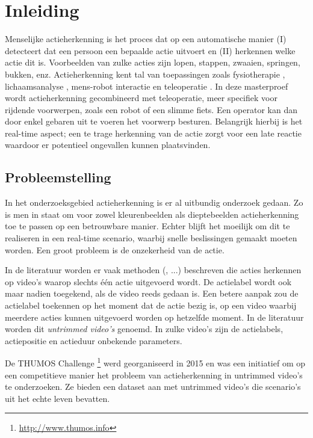 \setcounter{page}{1}
\chapter{Inleiding}
\label{ch:Inleiding}
Menselijke actieherkenning is het proces dat op een automatische manier (I) detecteert dat een persoon een bepaalde actie uitvoert en (II) herkennen welke actie dit is. Voorbeelden van zulke acties zijn lopen, stappen, zwaaien, springen, bukken, enz. Actieherkenning kent tal van toepassingen zoals fysiotherapie \cite{Deboeverie2016}, lichaamsanalyse \cite{Devi2015}, mens-robot interactie \cite{Li2018} en teleoperatie \cite{Ajili2017}. In deze masterproef wordt actieherkenning gecombineerd met teleoperatie, meer specifiek voor rijdende voorwerpen, zoals een robot of een slimme fiets. Een operator kan dan door enkel gebaren uit te voeren het voorwerp besturen. Belangrijk hierbij is het real-time aspect; een te trage herkenning van de actie zorgt voor een late reactie waardoor er potentieel ongevallen kunnen plaatsvinden. 

\section{Probleemstelling}
In het onderzoeksgebied actieherkenning is er al uitbundig onderzoek gedaan. Zo is men in staat om voor zowel kleurenbeelden als dieptebeelden actieherkenning toe te passen op een betrouwbare manier. Echter blijft het moeilijk om dit te realiseren in een real-time scenario, waarbij snelle beslissingen gemaakt moeten worden. Een groot probleem is de onzekerheid van de actie. 

In de literatuur worden er vaak methoden (\cite{Xia2012}, ...) beschreven die acties herkennen op video's waarop slechts één actie uitgevoerd wordt. De actielabel wordt ook maar nadien toegekend, als de video reeds gedaan is. Een betere aanpak zou de actielabel toekennen op het moment dat de actie bezig is, op een video waarbij meerdere acties kunnen uitgevoerd worden op hetzelfde moment. In de literatuur worden dit \textit{untrimmed video's} genoemd. In zulke video's zijn de actielabels, actiepositie en actieduur onbekende parameters.

De THUMOS Challenge \footnote{\url{http://www.thumos.info}} werd georganiseerd in 2015 en was een initiatief om op een competitieve manier het probleem van actieherkenning in untrimmed video's te onderzoeken. Ze bieden een dataset aan met untrimmed video's die scenario's uit het echte leven bevatten.


